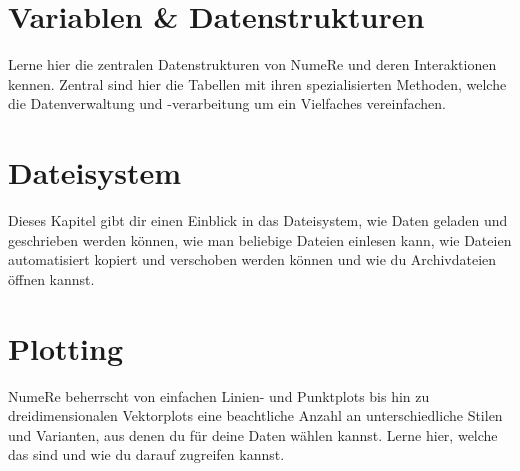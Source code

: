 \documentclass[DIV=17, parskip=half]{scrreprt}
\begin{document}
	\chapter{Variablen \& Datenstrukturen}
		Lerne hier die zentralen Datenstrukturen von NumeRe und deren Interaktionen kennen. Zentral sind hier die Tabellen mit ihren spezialisierten Methoden, welche die Datenverwaltung und -verarbeitung um ein Vielfaches vereinfachen.
		
		
		
		
		
		
		
		
	
	\chapter{Dateisystem}
		Dieses Kapitel gibt dir einen Einblick in das Dateisystem, wie Daten geladen und geschrieben werden k\"onnen, wie man beliebige Dateien einlesen kann, wie Dateien automatisiert kopiert und verschoben werden k\"onnen und wie du Archivdateien \"offnen kannst.
		
		
		
		
		
		
		
	
	\chapter{Plotting}
		NumeRe beherrscht von einfachen Linien- und Punktplots bis hin zu dreidimensionalen Vektorplots eine beachtliche Anzahl an unterschiedliche Stilen und Varianten, aus denen du f\"ur deine Daten w\"ahlen kannst. Lerne hier, welche das sind und wie du darauf zugreifen kannst.
		
		
		
		
		
		
		
		
		
		
		
		
		
		
		
		
		
	
\end{document}
